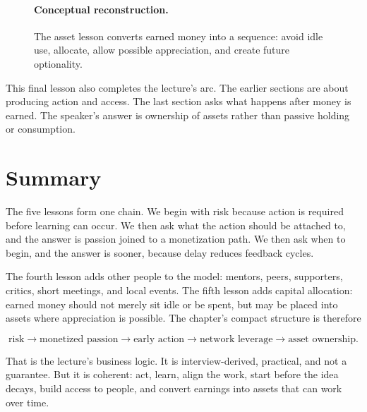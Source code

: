 \begin{figure}
\centering
{}

\paragraph{Conceptual reconstruction.}
The asset lesson converts earned money into a sequence: avoid idle use, allocate, allow possible appreciation, and create future optionality.
\end{figure}

This final lesson also completes the lecture's arc. The earlier sections are about producing action and access. The last section asks what happens after money is earned. The speaker's answer is ownership of assets rather than passive holding or consumption.

\section{Summary}

The five lessons form one chain. We begin with risk because action is required before learning can occur. We then ask what the action should be attached to, and the answer is passion joined to a monetization path. We then ask when to begin, and the answer is sooner, because delay reduces feedback cycles.

The fourth lesson adds other people to the model: mentors, peers, supporters, critics, short meetings, and local events. The fifth lesson adds capital allocation: earned money should not merely sit idle or be spent, but may be placed into assets where appreciation is possible. The chapter's compact structure is therefore

\begin{equation}
\text{risk}
\longrightarrow
\text{monetized passion}
\longrightarrow
\text{early action}
\longrightarrow
\text{network leverage}
\longrightarrow
\text{asset ownership}.
\end{equation}

That is the lecture's business logic. It is interview-derived, practical, and not a guarantee. But it is coherent: act, learn, align the work, start before the idea decays, build access to people, and convert earnings into assets that can work over time.